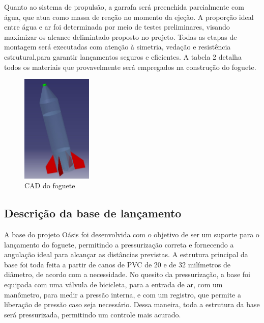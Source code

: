 Quanto ao sistema de propulsão, a garrafa será preenchida parcialmente com água, que atua como massa de reação no momento da ejeção. A proporção ideal entre água e ar foi determinada por meio de testes preliminares, visando maximizar os alcance delimintado proposto no projeto.
Todas as etapas de montagem será executadas com atenção à simetria, vedação e resistência estrutural,para garantir lançamentos seguros e eficientes. A tabela 2 detalha todos os materiais que provavelmente será empregados na construção do foguete.



 \begin{figure}[H]
     \centering
     \includegraphics[width=0.30\textwidth]{figuras/cad foguete.jpg}
    \caption{CAD do foguete}
     \label{fig:tabela}
 \end{figure}


\subsection{Descrição da base de lançamento}

    A base do projeto Oásis foi desenvolvida com o objetivo de ser um suporte para o lançamento do foguete, permitindo a pressurização correta e fornecendo a angulação ideal para alcançar as distâncias previstas. A estrutura principal da base foi toda feita a partir de canos de PVC de 20 e de 32 milímetros de diâmetro, de acordo com a necessidade. No quesito da pressurização, a base foi equipada com uma válvula de bicicleta, para a entrada de ar, com um manômetro, para medir a pressão interna, e com um registro, que permite a liberação de pressão caso seja necessário. Dessa maneira, toda a estrutura da base será pressurizada, permitindo um controle mais acurado.
    
